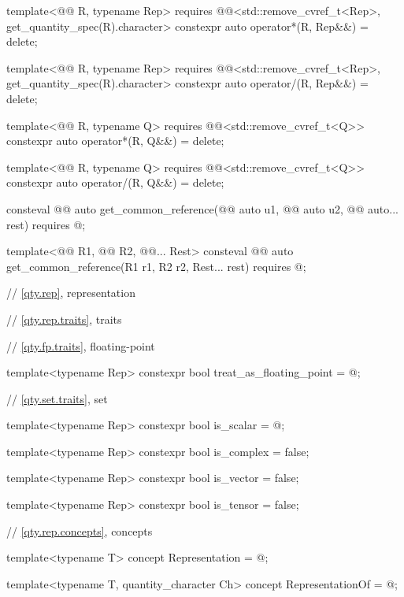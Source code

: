 \begin{codeblock}
template<@@ R, typename Rep>
  requires @@<std::remove_cvref_t<Rep>, get_quantity_spec(R{}).character>
constexpr auto operator*(R, Rep&&) = delete;

template<@@ R, typename Rep>
  requires @@<std::remove_cvref_t<Rep>, get_quantity_spec(R{}).character>
constexpr auto operator/(R, Rep&&) = delete;

template<@@ R, typename Q>
  requires @@<std::remove_cvref_t<Q>>
constexpr auto operator*(R, Q&&) = delete;

template<@@ R, typename Q>
  requires @@<std::remove_cvref_t<Q>>
constexpr auto operator/(R, Q&&) = delete;

consteval @@ auto get_common_reference(@@ auto u1,
                                                   @@ auto u2,
                                                   @@ auto... rest)
  requires @\seebelownc@;

template<@@ R1, @@ R2, @@... Rest>
consteval @@ auto get_common_reference(R1 r1, R2 r2, Rest... rest)
  requires @\seebelownc@;

// \ref{qty.rep}, representation

// \ref{qty.rep.traits}, traits

// \ref{qty.fp.traits}, floating-point

template<typename Rep>
constexpr bool treat_as_floating_point = @\seebelownc@;

// \ref{qty.set.traits}, set

template<typename Rep>
constexpr bool is_scalar = @\seebelownc@;

template<typename Rep>
constexpr bool is_complex = false;

template<typename Rep>
constexpr bool is_vector = false;

template<typename Rep>
constexpr bool is_tensor = false;

// \ref{qty.rep.concepts}, concepts

template<typename T>
concept Representation = @\seebelownc@;

template<typename T, quantity_character Ch>
concept RepresentationOf = @\seebelownc@;


\end{codeblock}
